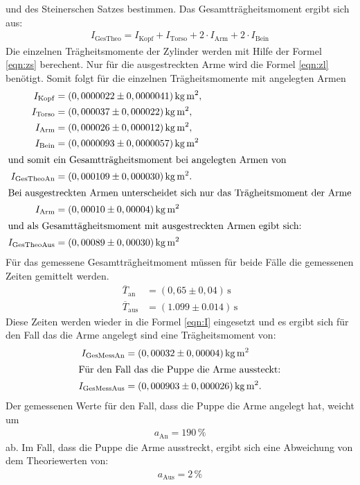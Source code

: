 und des Steinerschen Satzes bestimmen. Das Gesamtträgheitsmoment ergibt sich aus:
\begin{align}
  I_\mathrm{GesTheo}=I_\mathrm{Kopf}+I_\mathrm{Torso}+2\cdot I_\mathrm{Arm}+2\cdot I_\mathrm{Bein}
\end{align}
Die einzelnen Trägheitsmomente der Zylinder werden
mit Hilfe der Formel \eqref{eqn:zs} berechent.
Nur für die ausgestreckten Arme wird
die Formel \eqref{eqn:zl} benötigt.
Somit folgt für die einzelnen Trägheitsmomente mit angelegten Armen
\begin{align*}
I_\mathrm{Kopf} &=(0,0000022\pm0,0000041)\,\si{\kilo\gram\meter\squared},\\
I_\mathrm{Torso}&=(0,000037\pm0,000022)\,\si{\kilo\gram\meter\squared},\\
I_\mathrm{Arm}  &=(0,000026\pm0,000012)\,\si{\kilo\gram\meter\squared},\\
I_\mathrm{Bein} &=(0,0000093\pm0,0000057)\,\si{\kilo\gram\meter\squared}\\
\intertext{und somit ein Gesamtträgheitsmoment bei angelegten Armen von}
I_\mathrm{GesTheoAn}&=(0,000109\pm0,000030)\,\si{\kilo\gram\meter\squared}.\\
\intertext{Bei ausgestreckten Armen unterscheidet sich nur das Trägheitsmoment der Arme}
I_\mathrm{Arm}&=(0,00010\pm0,00004)\,\si{\kilo\gram\meter\squared}\\
\intertext{und als Gesamttägheitsmoment mit ausgestreckten Armen egibt sich:}
I_\mathrm{GesTheoAus}&=(0,00089\pm0,00030)\,\si{\kilo\gram\meter\squared}\\
\end{align*}
Für das gemessene Gesamtträgheitmoment
müssen für beide Fälle
die gemessenen Zeiten gemittelt werden.
\begin{align*}
\overline{T}_\mathrm{an} &=(0,65\pm0,04)\,\si{\second}\\
\overline{T}_\mathrm{aus}&=(1.099\pm0.014)\,\si{\second}
\end{align*}
Diese Zeiten werden wieder in die Formel \eqref{eqn:I}
eingesetzt und es ergibt sich für den Fall das
die Arme angelegt sind eine Trägheitsmoment von:
\begin{align*}
I_\mathrm{GesMessAn}&=(0,00032\pm0,00004)\,\si{\kilo\gram\meter\squared}\\
\intertext{Für den Fall das die Puppe die Arme aussteckt:}
I_\mathrm{GesMessAus}&= (0,000903\pm0,000026)\,\si{\kilo\gram\meter\squared}.\\
\end{align*}
Der gemessenen Werte für den Fall, dass die Puppe die Arme angelegt hat,
weicht um
\begin{align*}
  a_\mathrm{An}=190\,\si{\percent}
\end{align*}
ab. Im Fall, dass die Puppe die Arme ausstreckt, ergibt sich
eine Abweichung von dem Theoriewerten von:
\begin{align*}
  a_\mathrm{Aus}=2\,\si{\percent}
\end{align*}
